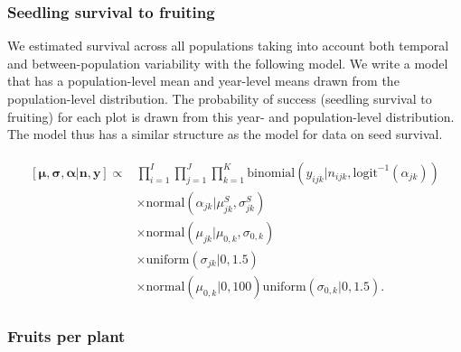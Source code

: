 \documentclass[12pt, oneside, titlepage]{article}   	%
\begin{document}
\subsubsection*{Seedling survival to fruiting}

We estimated survival across all populations taking into account both temporal and between-population variability with the following model. We write a model that has a population-level mean and year-level means drawn from the population-level distribution. The probability of success (seedling survival to fruiting) for each plot is drawn from this year- and population-level distribution. The model thus has a similar structure as the model for data on seed survival.


\begin{align}
  \begin{split}
 [ \bm{\mu}, \bm{\sigma}, \bm{\alpha} | \bm{n}, \bm{y} ] \propto 
 & \prod_{i=1}^{I} \prod_{j=1}^{J} \prod_{k=1}^{K} \mathrm{binomial} ( y_{ijk} | n_{ijk}, \mathrm{logit}^{-1}( \alpha_{jk} )  )
   \\ & \times \mathrm{normal} ( \alpha_{jk}  | \mu^S_{jk}, \sigma^S_{jk} )
  \\ & \times \mathrm{normal} ( \mu_{jk}  | \mu_{0,k}, \sigma_{0,k} )
  \\ & \times \mathrm{uniform} ( \sigma_{jk} | 0, 1.5)
  \\ & \times \mathrm{normal} ( \mu_{0,k} | 0 , 100 ) \mathrm{uniform} ( \sigma_{0,k} | 0, 1.5 ).
   \end{split}
\end{align}
%

\subsubsection*{Fruits per plant}
\end{document}
